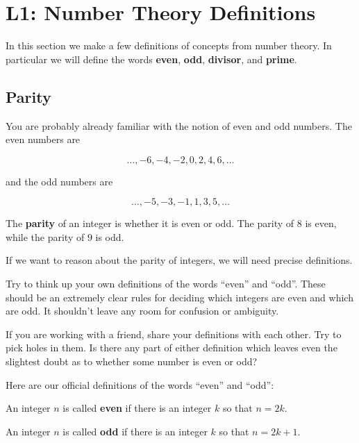 \chapter{L1:  Number Theory Definitions}

In this section we make a few definitions of concepts from number theory.  In particular we will define the words  \textbf{even}, \textbf{odd}, \textbf{divisor}, and \textbf{prime}.

\section{Parity}
You are probably already familiar with the notion of even and odd numbers.   The even numbers are 

$$
\dots, -6, -4, -2, 0 , 2, 4, 6,  \dots
$$

and the odd numbers are 

$$
\dots,  -5, -3, -1, 1, 3, 5, \dots
$$

The \textbf{parity} of an integer is whether it is even or odd.  The parity of $8$ is even, while the parity of $9$ is odd.

If we want to reason about the parity of integers, we will need precise definitions.

\begin{stopthink}
	Try to think up your own definitions of the words ``even'' and ``odd''.  These should be an extremely clear rules for deciding which integers are even and which are odd.  It shouldn't leave any room for confusion or ambiguity.
	
	If you are working with a friend, share your definitions with each other.  Try to pick holes in them.  Is there any part of either definition which leaves even the slightest doubt as to whether some number is even or odd?
\end{stopthink}

\newpage

Here are our official definitions of the words ``even'' and ``odd'':

\begin{definition}
	
	An integer $n$ is called \textbf{even} if there is an integer $k$ so that $n = 2k$.
\end{definition}

\begin{definition}
	An integer $n$ is called \textbf{odd} if  there is an integer $k$ so that $n = 2k+1$.
\end{definition}

